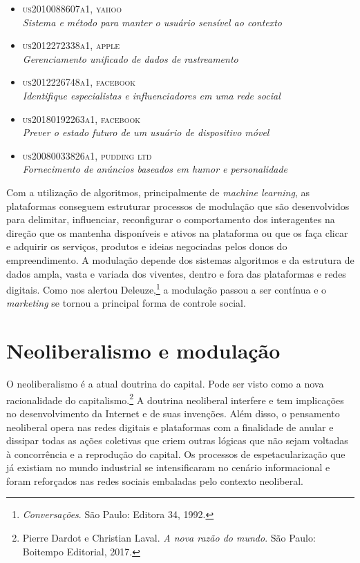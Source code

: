\begin{itemize}
\item
  \textsc{us2010088607a1, yahoo}\\
  \textit{Sistema e método para manter o usuário sensível ao contexto}
\item
  \textsc{us2012272338a1, apple}\\
  \textit{Gerenciamento unificado de dados de rastreamento}
\item
  \textsc{us2012226748a1, facebook}\\
  \textit{Identifique especialistas e influenciadores em uma rede social}
\item
  \textsc{us20180192263a1, facebook}\\
  \textit{Prever o estado futuro de um usuário de dispositivo móvel}
\item
  \textsc{us20080033826a1, pudding ltd}\\
  \textit{Fornecimento de anúncios baseados em humor e personalidade}
\end{itemize}

Com a utilização de algoritmos, principalmente de \textit{machine
learning}, as plataformas conseguem estruturar processos de modulação
que são desenvolvidos para delimitar, influenciar, reconfigurar o
comportamento dos interagentes na direção que os mantenha disponíveis e
ativos na plataforma ou que os faça clicar e adquirir os serviços,
produtos e ideias negociadas pelos donos do empreendimento. A modulação
depende dos sistemas algoritmos e da estrutura de dados ampla, vasta e
variada dos viventes, dentro e fora das plataformas e redes digitais.
Como nos alertou Deleuze,\footnote{\textit{Conversações}. São Paulo:
Editora 34, 1992.} a modulação passou a ser contínua e o
\textit{marketing} se tornou a principal forma de controle social.

\section{Neoliberalismo e modulação}

O neoliberalismo é a atual doutrina do capital. Pode ser visto como a
nova racionalidade do capitalismo.\footnote{Pierre Dardot e Christian Laval. \textit{A nova razão do mundo}. São Paulo: Boitempo Editorial, 2017.} A doutrina
neoliberal interfere e tem implicações no desenvolvimento da Internet e
de suas invenções. Além disso, o pensamento neoliberal opera nas redes
digitais e plataformas com a finalidade de anular e dissipar todas as
ações coletivas que criem outras lógicas que não sejam voltadas à
concorrência e a reprodução do capital. Os processos de
espetacularização que já existiam no mundo industrial se intensificaram
no cenário informacional e foram reforçados nas redes sociais embaladas
pelo contexto neoliberal.

